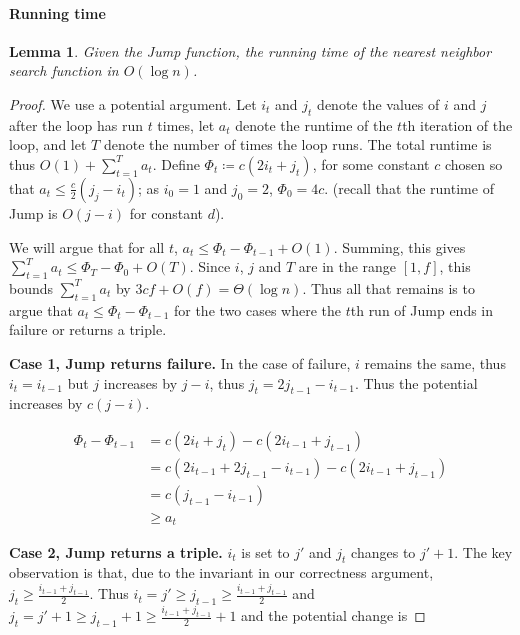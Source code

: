 \documentclass[12pt,a4paper,USenglish,cleveref, autoref, thm-restate]{article}
\newcommand{\yakov}[1]{\textcolor{blue}{Yakov: #1}}
\newtheorem{lemma}{Lemma}
\newcommand{\yakov}[1]{\textcolor{blue}{Yakov: #1}}
\newcommand{\yakov}[1]{\textcolor{blue}{Yakov: #1}}
\begin{document}
\paragraph*{Running time} 
\begin{lemma}
  \label{lemma:querytime}
Given the Jump function, the running time of the nearest neighbor search function in $O(\log n)$.
\end{lemma}

\begin{proof}
We use a potential argument. Let $i_t$ and $j_t$ denote the values of $i$ and $j$ after the loop has run $t$ times, let $a_t$ denote the runtime of the $t$th iteration of the loop, and let $T$ denote the number of times the loop runs. The total runtime is thus $O(1)+\sum_{t=1}^{T} a_t$. Define $\Phi_t \coloneqq c(2i_t+j_t)$, for some constant $c$ chosen so that $a_t \leq \frac{c}{2}(j_j-i_t)$; as $i_0=1$ and $j_0=2$, $\Phi_0=4c$. (recall that the runtime of Jump is $O(j-i)$ for constant $d$). 



We will argue that for all $t$, 
$ a_t  \leq \Phi_{t}-\Phi_{t-1} + O(1)$.
Summing, this gives $\sum_{t=1}^{T} a_t \leq \Phi_{T}-\Phi_{0}+O(T)$. Since $i$, $j$ and $T$ are in the range $[1,f]$, this bounds $\sum_{t=1}^{T} a_t$ by $3cf+O(f)=\Theta(\log n)$. %
%
%
Thus all that remains is to argue that $a_t \leq \Phi_{t}-\Phi_{t-1}$ for the two cases where the $t$th run of Jump ends in failure or  returns a triple.

\noindent
\textbf{Case 1, Jump returns failure.}
In the case of failure, $i$ remains the same, thus $i_t=i_{t-1}$ but $j$ increases by $j-i$, thus $j_t=2j_{t-1}-i_{t-1}$. Thus the potential increases by $c(j-i)$.

 \begin{align*}
 \Phi_t-\Phi_{t-1}&=  c(2i_t+j_t) - c(2i_{t-1}+j_{t-1})\\
 &= c(2i_{t-1}+2j_{t-1}-i_{t-1}) - c(2i_{t-1}+j_{t-1})
\\
 &= c(j_{t-1}-i_{t-1})
\\
&\geq a_t
\end{align*}

\noindent
\textbf{Case 2, Jump returns a triple.} 
$i_{t}$ is set to $j'$ and $j_{t}$ changes to $j'+1$. 
The key observation is that, due to the invariant in our correctness argument,  $j_t \geq \frac{i_{t-1}+j_{t-1}}{2}$.
Thus $i_{t}=j'\ge j_{t-1}\geq \frac{i_{t-1}+j_{t-1}}{2}$ and $j_{t}= j'+1 \ge j_{t-1}+1\geq \frac{i_{t-1}+j_{t-1}}{2}+1$
and the potential change is


\end{proof}
\end{document}
